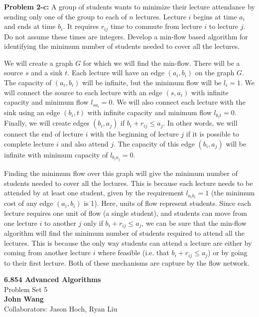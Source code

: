 \documentclass[psamsfonts]{amsart}
\newenvironment{sol}{\vspace{0.25cm}{\large \bfseries Solution:}}{\qedsymbol}
\newenvironment{prob}[1]{\begin{framed}{\large \bfseries Problem #1:}}{\end{framed}}
\newcommand{\makenewtitle}{
    \begin{center}
    {\huge \bfseries 6.854 Advanced Algorithms} \\
    Problem Set 5\\
    \vspace{0.25cm}
    {\bfseries John Wang} \\
    Collaborators: Jason Hoch, Ryan Liu
    \end{center}
    \vspace{0.5cm}
}
\begin{document}
\begin{prob}{2-c}
A group of students wants to minimize their lecture attendance by sending only one of the group to each of $n$ lectures. Lecture $i$ begins at time $a_i$ and ends at time $b_i$. It requires $r_{ij}$ time to commute from lecture $i$ to lecture $j$. Do not assume these times are integers. Develop a min-flow based algorithm for identifying the minimum number of students needed to cover all the lectures.
\end{prob}
\begin{sol}
We will create a graph $G$ for which we will find the min-flow. There will be a source $s$ and a sink $t$. Each lecture will have an edge $(a_i, b_i)$ on the graph $G$. The capacity of $(a_i, b_i)$ will be infinite, but the minimum flow will be $l_{i} = 1$. We will connect the source to each lecture with an edge $(s, a_i)$ with infinite capacity and minimum flow $l_{s a_i} = 0$. We will also connect each lecture with the sink using an edge $(b_i, t)$ with infinite capacity and minimum flow $l_{b_i t} = 0$. Finally, we will create edges $(b_i, a_j)$ if $b_i + r_{ij} \leq a_j$. In other words, we will connect the end of lecture $i$ with the beginning of lecture $j$ if it is possible to complete lecture $i$ and also attend $j$. The capacity of this edge $(b_i, a_j)$ will be infinite with minimum capacity of $l_{b_i a_j} = 0$.

Finding the minimum flow over this graph will give the minimum number of students needed to cover all the lectures. This is because each lecture needs to be attended by at least one student, given by the requirement $l_{a_i b_i} = 1$ (the minimum cost of any edge $(a_i, b_i)$ is 1). Here, units of flow represent students. Since each lecture requires one unit of flow (a single student), and students can move from one lecture $i$ to another $j$ only if $b_i + r_{ij} \leq a_j$, we can be sure that the min-flow algorithm will find the minimum number of students required to attend all the lectures. This is because the only way students can attend a lecture are either by coming from another lecture $i$ where feasible (i.e. that $b_i + r_{ij} \leq a_j$) or by going to their first lecture. Both of these mechanisms are capture by the flow network. 
\end{sol}

\newpage
\makenewtitle
\end{document}
